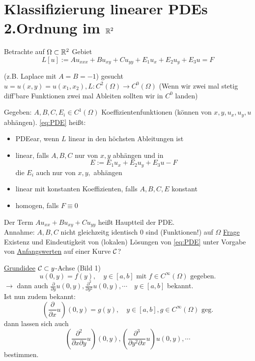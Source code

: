 \section{Klassifizierung linearer PDEs 2.Ordnung im $\mathbb{R}^2$}
Betrachte auf $\Omega\subset\mathbb{R}^2$ Gebiet 
\begin{equation} %
    L[u] := A u_{xxx} + Bu_{xy} + Cu_{yy} + E_1 u_x + E_2 u_y + E_3 u = F
    \label{eq:PDE}
\end{equation}

(z.B. Laplace mit $A=B=-1$)%
gesucht $u=u(x,y)=u(x_1,x_2), L:C^2(\Omega)\to C^0(\Omega) $
(Wenn wir zwei mal stetig diff'bare Funktionen zwei mal Ableiten sollten wir in $C^0$ landen)

Gegeben: $A,B,C,E_i\in C^1(\Omega)$ Koeffizientenfunktionen (können von $x,y,u_x,u_y,u$ abhängen).
\eqref{eq:PDE} heißt: 

\begin{itemize}
        \item PDEear, wenn $L$ linear in den höchsten Ableitungen ist
        \item linear, falls $A,B,C$ nur von $x,y$ abhängen und in
            \begin{equation} %
                E:= E_1 u_x + E_2 u_y + E_3 u - F
            \end{equation}
            die $E_i$ auch nur von $x,y,$ abhängen
        \item linear mit konstanten Koeffizienten, falls $A,B,C,E$ konstant
        \item homogen, falls $F\equiv 0$
\end{itemize}

Der Term $Au_{xx} + Bu_{xy} + Cu_{yy}$ heißt Hauptteil der PDE. \\

Annahme: $A,B,C$ nicht gleichzeitg identisch $0$ sind (Funktionen!) auf $\Omega$
\underline{Frage} Existenz und Eindeutigkeit von (lokalen) Lösungen von \eqref{eq:PDE} unter Vorgabe von \underline{Anfangswerten} auf einer Kurve $\mathcal{C}$? 


\underline{Grundidee}
$\mathcal{C} \subset y$-Achse (Bild 1)
\begin{equation} %
    u(0,y) = f(y), \quad y\in[a,b] \text{ mit } f\in C^{\infty}(\Omega) \text{ gegeben.}
    \label{}
\end{equation}
$\to$ dann auch $\frac{\partial}{\partial y} u(0,y), \frac{\partial^2}{\partial y^2} u(0,y),\cdots \quad y\in [a,b]$ bekannt.\\
Ist nun zudem bekannt: 
\[
    \left( \frac{\partial}{\partial x} u \right) (0,y) = g(y), \quad y\in [a,b], g\in C^{\infty}(\Omega) \text{ geg.}
\]
dann lassen sich auch 
\[
    \left( \frac{\partial^2}{\partial x \partial y} u\right)(0,y), 
    \left( \frac{\partial^3}{\partial y^2 \partial x} u \right)u(0,y), \cdots
\]
bestimmen.\\


